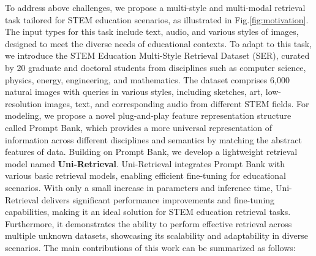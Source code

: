 To address above challenges, we propose a multi-style and multi-modal retrieval task tailored for STEM education scenarios, as illustrated in Fig.\ref{fig:motivation}.
The input types for this task include text, audio, and various styles of images, designed to meet the diverse needs of educational contexts.
To adapt to this task, we introduce the STEM Education Multi-Style Retrieval Dataset (SER), curated by 20 graduate and doctoral students from disciplines such as computer science, physics, energy, engineering, and mathematics. The dataset comprises 6,000 natural images with queries in various styles, including sketches, art, low-resolution images, text, and corresponding audio from different STEM fields.
For modeling, we propose a novel plug-and-play feature representation structure called Prompt Bank, which provides a more universal representation of information across different disciplines and semantics by matching the abstract features of data.
Building on Prompt Bank, we develop a lightweight retrieval model named {\bf Uni-Retrieval}.
Uni-Retrieval integrates Prompt Bank with various basic retrieval models, enabling efficient fine-tuning for educational scenarios.
With only a small increase in parameters and inference time, Uni-Retrieval delivers significant performance improvements and fine-tuning capabilities, making it an ideal solution for STEM education retrieval tasks.
Furthermore, it demonstrates the ability to perform effective retrieval across multiple unknown datasets, showcasing its scalability and adaptability in diverse scenarios.
The main contributions of this work can be summarized as follows:
\vspace{-0.5\intextsep}
